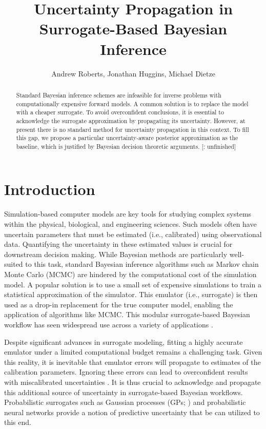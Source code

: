 \documentclass[12pt]{article}
\title{Uncertainty Propagation in Surrogate-Based Bayesian Inference}
\author{Andrew Roberts, Jonathan Huggins, Michael Dietze}
\begin{document}
\maketitle

\begin{abstract}
Standard Bayesian inference schemes are infeasible for inverse problems 
with computationally expensive forward models. A common solution is to 
replace the model with a cheaper surrogate. To avoid overconfident 
conclusions, it is essential to acknowledge the surrogate approximation by propagating 
its uncertainty. However, at present there is no standard method for uncertainty 
propagation in this context. To fill this gap, we propose a particular uncertainty-aware 
posterior approximation as the baseline, which is justified by Bayesian decision theoretic
arguments. [\todo: unfinished]
\end{abstract}

\section{Introduction}
Simulation-based computer models are key tools for studying complex systems within 
the physical, biological, and engineering sciences. Such models often have 
uncertain parameters that must be estimated (i.e., calibrated) using observational data.
Quantifying the uncertainty in these estimated values is crucial for downstream 
decision making. While Bayesian methods are particularly well-suited to this task, 
standard Bayesian inference algorithms such as Markov chain Monte Carlo (MCMC) 
are hindered by the computational cost of the simulation model. A popular solution 
is to use a small set of expensive simulations to train a statistical approximation 
of the simulator. This emulator (i.e., surrogate) is then used as a drop-in replacement 
for the true computer model, enabling the application of algorithms like MCMC. 
This modular surrogate-based Bayesian workflow has seen widespread use across
a variety of applications \citep{FerEmulation,FadikarAgentBased,idealizedGCM,
trainDynamics,FATES_CES,CLMBayesianCalibration}.

Despite significant advances in surrogate modeling, fitting a 
highly accurate emulator under a limited computational budget remains a challenging task.
Given this reality, it is inevitable that emulator errors will propagate to estimates
of the calibration parameters. Ignoring these errors can lead to overconfident results 
with miscalibrated uncertainties \citep{BilionisBayesSurrogates,BurknerSurrogate}.
It is thus crucial to acknowledge and propagate this additional source of uncertainty in 
surrogate-based Bayesian workflows. 
Probabilistic surrogates such as Gaussian processes (GPs; \citet{gpML,gramacy2020surrogates}) 
and probabilistic neural networks \citep{deepEnsembles,BayesOptNN} provide a notion of 
predictive uncertainty that be can utilized to this end.
\end{document}
